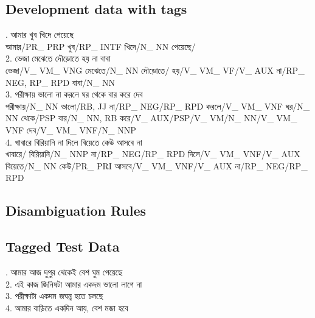 \documentclass[11pt,a4paper,twocolumn]{article}
\begin{document}
	\subsection{Development data with tags}
	{. \textcolor{diff}{আমার খুব খিদে পেয়েছে} \\
	আমার/\textcolor{hlit}{PR\_ PRP}
	খুব/\textcolor{hlit}{RP\_ INTF}
	খিদে/\textcolor{hlit}{N\_ NN}
	পেয়েছে/\textcolor{hlit}{}\\
	$ $\\
	2. \textcolor{diff}{ভেজা মেঝেতে দৌড়োতে হয় না বাবা} \\
	ভেজা/\textcolor{hlit}{V\_ VM\_ VNG}
	মেঝেতে/\textcolor{hlit}{N\_ NN}
	দৌড়োতে/\textcolor{hlit}{}
	হয়/\textcolor{hlit}{V\_ VM\_ VF/V\_ AUX}
	না/\textcolor{hlit}{RP\_ NEG, RP\_ RPD}
	বাবা/\textcolor{hlit}{N\_ NN}\\
	$ $\\
	3. \textcolor{diff}{পরীক্ষায় ভালো না করলে ঘর থেকে বার করে দেব} \\
	পরীক্ষায়/\textcolor{hlit}{N\_ NN}
	ভালো/\textcolor{hlit}{RB, JJ}
	না/\textcolor{hlit}{RP\_ NEG/RP\_ RPD}
	করলে/\textcolor{hlit}{V\_ VM\_ VNF}
	ঘর/\textcolor{hlit}{N\_ NN}
	থেকে/\textcolor{hlit}{PSP}
	বার/\textcolor{hlit}{N\_ NN, RB}
	করে/\textcolor{hlit}{V\_ AUX/PSP/V\_ VM/N\_ NN/V\_ VM\_ VNF}
	দেব/\textcolor{hlit}{V\_ VM\_ VNF/N\_ NNP}\\
	$ $\\
	4. \textcolor{diff}{খাবারে বিরিয়ানি না দিলে বিয়েতে কেউ আসবে না} \\
	খাবারে/\textcolor{hlit}{}
	বিরিয়ানি/\textcolor{hlit}{N\_ NNP}
	না/\textcolor{hlit}{RP\_ NEG/RP\_ RPD}
	দিলে/\textcolor{hlit}{V\_ VM\_ VNF/V\_ AUX}
	বিয়েতে/\textcolor{hlit}{N\_ NN}
	কেউ/\textcolor{hlit}{PR\_ PRI}
	আসবে/\textcolor{hlit}{V\_ VM\_ VNF/V\_ AUX}
	না/\textcolor{hlit}{RP\_ NEG/RP\_ RPD}\\
	
	
	}
	\subsection{Disambiguation Rules}
	
	\subsection{Tagged Test Data}	
	{. \textcolor{diff}{আমার আজ দুপুর থেকেই বেশ ঘুম পেয়েছে} \\
	$ $\\
	2. \textcolor{diff}{এই কাজ জিনিষটা আমার একদম ভালো লাগে না} \\
	$ $\\
	3. \textcolor{diff}{পরীক্ষাটা একদম জঘন্ন হতে চলছে} \\
	$ $\\
	4. \textcolor{diff}{আমার বাড়িতে একদিন আয়, বেশ মজা হবে} \\
	}
\end{document}

